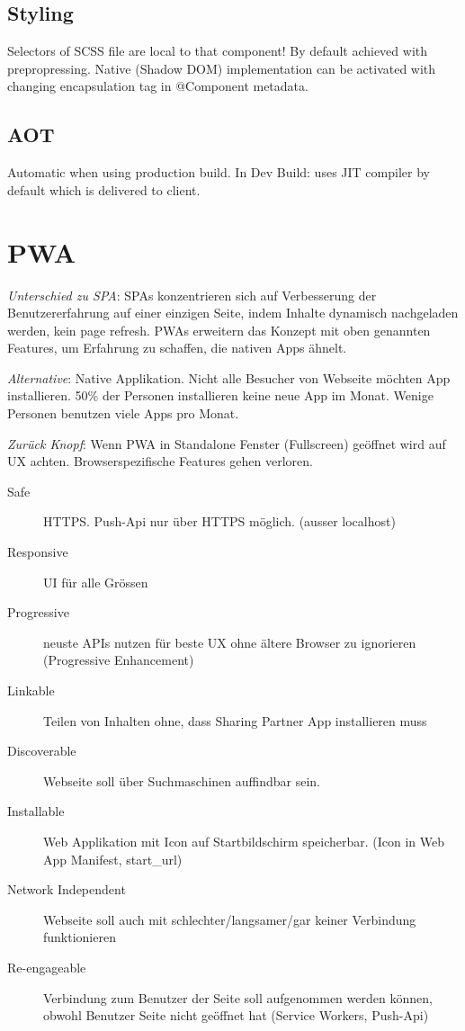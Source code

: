 \begin{multicols*}{2}
\subsection{Styling}
Selectors of SCSS file are local to that component! By default achieved with prepropressing. Native (Shadow DOM) implementation can be activated with changing encapsulation tag in @Component metadata.

\subsection{AOT}
Automatic when using production build. In Dev Build: uses JIT compiler by default which is delivered to client.

\section{PWA}
\textit{Unterschied zu SPA}: SPAs konzentrieren sich auf Verbesserung der
Benutzererfahrung auf einer einzigen Seite, indem Inhalte dynamisch nachgeladen
werden, kein page refresh. PWAs erweitern das Konzept mit oben genannten
Features, um Erfahrung zu schaffen, die nativen Apps ähnelt.

\textit{Alternative}: Native Applikation. Nicht alle Besucher von Webseite möchten App installieren. 50\% der Personen installieren keine neue App im Monat. Wenige Personen benutzen viele Apps pro Monat.

\textit{Zurück Knopf}: Wenn PWA in Standalone Fenster (Fullscreen) geöffnet wird auf UX achten. Browserspezifische Features gehen verloren.

\begin{description}
    \item[Safe] HTTPS. Push-Api nur über HTTPS möglich. (ausser localhost)
    \item[Responsive] UI für alle Grössen
    \item[Progressive] neuste APIs nutzen für beste UX ohne ältere Browser zu ignorieren (Progressive Enhancement)
    \item[Linkable] Teilen von Inhalten ohne, dass Sharing Partner App installieren muss
    \item[Discoverable] Webseite soll über Suchmaschinen auffindbar sein.
    \item[Installable] Web Applikation mit Icon auf Startbildschirm speicherbar. (Icon in Web App Manifest, start\_url)
    \item[Network Independent] Webseite soll auch mit schlechter/langsamer/gar keiner Verbindung funktionieren
    \item[Re-engageable] Verbindung zum Benutzer der Seite soll aufgenommen werden können, obwohl Benutzer Seite nicht geöffnet hat (Service Workers, Push-Api)
\end{description}


\end{multicols*}
